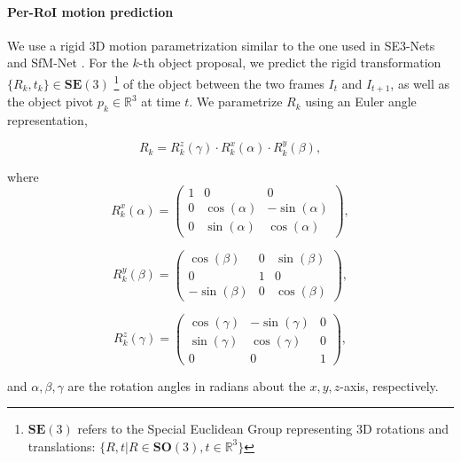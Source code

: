 \paragraph{Per-RoI motion prediction}
We use a rigid 3D motion parametrization similar to the one used in SE3-Nets and SfM-Net \cite{SE3Nets, SfmNet}.
For the $k$-th object proposal, we predict the rigid transformation $\{R_k, t_k\}\in \mathbf{SE}(3)$
\footnote{$\mathbf{SE}(3)$ refers to the Special Euclidean Group representing 3D rotations
and translations: $\{R, t|R \in \mathbf{SO}(3), t \in \mathbb{R}^3\}$}
of the object between the two frames $I_t$ and $I_{t+1}$, as well as the object pivot $p_k \in \mathbb{R}^3$ at time $t$.
We parametrize ${R_k}$ using an Euler angle representation,

\begin{equation}
R_k = R_k^z(\gamma) \cdot R_k^x(\alpha) \cdot R_k^y(\beta),
\end{equation}

where
\begin{equation}
R_k^x(\alpha) =
\begin{pmatrix}
  1 & 0 & 0 \\
  0 & \cos(\alpha) & -\sin(\alpha) \\
  0 & \sin(\alpha) & \cos(\alpha)
\end{pmatrix},
\end{equation}

\begin{equation}
R_k^y(\beta) =
\begin{pmatrix}
  \cos(\beta) & 0 & \sin(\beta) \\
  0 & 1 & 0 \\
  -\sin(\beta) & 0 & \cos(\beta)
\end{pmatrix},
\end{equation}

\begin{equation}
R_k^z(\gamma) =
\begin{pmatrix}
  \cos(\gamma) & -\sin(\gamma) & 0 \\
  \sin(\gamma) & \cos(\gamma) & 0 \\
  0 & 0 & 1
\end{pmatrix},
\end{equation}

and $\alpha, \beta, \gamma$ are the rotation angles in radians about the $x,y,z$-axis, respectively.

